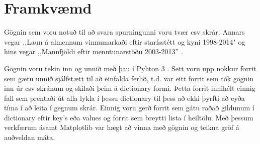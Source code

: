 \documentclass[12pt, git, draft]{rureport}
\begin{document}



\section{Framkvæmd}

Gögnin sem voru notuð til að svara spurningunni voru tvær csv skrár. Annars vegar ,,Laun á almennum vinnumarkaði eftir starfsstétt og kyni 1998-2014" \cite{HG1} og hins vegar ,,Mannfjöldi eftir menntunarstöðu 2003-2013'' \cite{HG2}.

Gögnin voru tekin inn og unnið með þau í Pyhton 3 \cite{pyhton3}. Sett voru upp nokkur forrit sem gætu unnið sjálfstætt til að einfalda ferlið, t.d. var eitt forrit sem tók gögnin inn úr csv skránum og skilaði þeim á dictionary formi. Þetta forrit innihélt einnig fall sem prentaði út alla lykla í þessu dictionary til þess að ekki þyrfti að eyða tíma í að leita í gegnum skrár.
Einnig voru gerð forrit sem gátu raðað gildunum í dictionary eftir key's eða values og forrit sem breytti lista í heiltölu.
Með þessum verkfærum ásamt Matplotlib \cite{lib} var hægt að vinna með gögnin og teikna gröf á auðveldan máta. 


\end{document}
